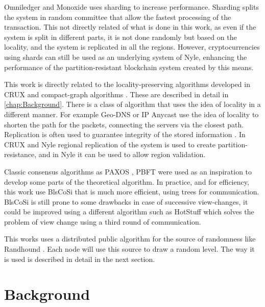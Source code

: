 \documentclass[a4paper,11pt,oneside]{report}
\begin{document}
Omniledger \cite{Kokoris-Kogias2017}  and Monoxide \cite{Wang2019} uses
sharding to increase performance.  Sharding splits the system in random
committee that allow the fastest processing of the transaction. This not
directly related of what is done in this work, as even if the system is split
in different parts, it is not done randomly but based on the locality, and the
system is replicated in all the regions. However, cryptocurrencies using shards
can still be used as an underlying system of Nyle, enhancing the performance of
the partition-resistant blockchain system created by this means.

This work is directly related to the locality-preserving algorithms developed
in CRUX \cite{Basescu2014} and compact-graph algorithms \cite{Thorup2005}.
These are described in detail in \autoref{chap:Background}. There is a class of
algorithm that uses the idea of locality in a different manner. For example
Geo-DNS \cite{Katz-bassett2006} or IP Anycast \cite{Abley2006} use the idea of
locality to shorten the path for the packets, connecting the servers via the
closest path. Replication is often used to guarantee integrity of the stored
information \cite{find-paper-replication}. In CRUX \cite{Basescu2014} and Nyle
regional replication of the system is used to create partition-resistance, and
in Nyle it can be used to allow region validation.

Classic consensus algorithms as PAXOS \cite{Lamport2000}, PBFT
\cite{Castro1999} were used as an inspiration to develop some parts of the
theoretical algorithm. In practice, and for efficiency, this work use BlsCoSi
\cite{Boneh2018} that is much more efficient, using trees for communication.
BlsCoSi \cite{Boneh2018} is still prone to some drawbacks in case of successive
view-changes, it could be improved using a different algorithm such as HotStuff
\cite{Yin2018} which solves the problem of view change using a third round of
communication. %

This works uses a distributed public algorithm for the source of randomness
like Randhound \cite{Syta2016}. Each node will use this source to draw a random
level.  The way it is used is described in detail in the next section. 


\chapter{Background} \label{chap:Background}

\end{document}
